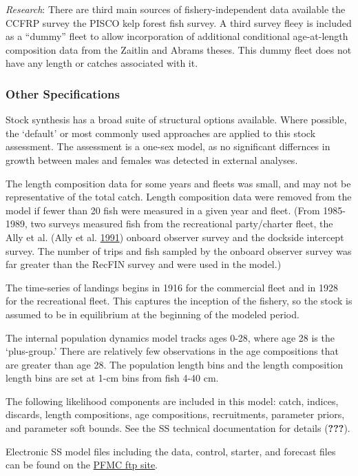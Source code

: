 \documentclass[12pt,]{article}
\begin{document}
\emph{Research}: There are third main sources of fishery-independent
data available the CCFRP survey the PISCO kelp forest fish survey. A
third survey fleey is included as a ``dummy'' fleet to allow
incorporation of additional conditional age-at-length composition data
from the Zaitlin and Abrams theses. This dummy fleet does not have any
length or catches associated with it.

\subsubsection{Other Specifications}\label{other-specifications}

Stock synthesis has a broad suite of structural options available. Where
possible, the `default' or most commonly used approaches are applied to
this stock assessment. The assessment is a one-sex model, as no
significant differnces in growth between males and females was detected
in external analyses.

The length composition data for some years and fleets was small, and may
not be representative of the total catch. Length composition data were
removed from the model if fewer than 20 fish were measured in a given
year and fleet. (From 1985-1989, two surveys measured fish from the
recreational party/charter fleet, the Ally et al. (Ally et al.
\protect\hyperlink{ref-Ally1991}{1991}) onboard observer survey and the
dockside intercept survey. The number of trips and fish sampled by the
onboard observer survey was far greater than the RecFIN survey and were
used in the model.)

The time-series of landings begins in 1916 for the commercial fleet and
in 1928 for the recreational fleet. This captures the inception of the
fishery, so the stock is assumed to be in equilibrium at the beginning
of the modeled period.

The internal population dynamics model tracks ages 0-28, where age 28 is
the `plus-group.' There are relatively few observations in the age
compositions that are greater than age 28. The population length bins
and the length composition length bins are set at 1-cm bins from fish
4-40 cm.

The following likelihood components are included in this model: catch,
indices, discards, length compositions, age compositions, recruitments,
parameter priors, and parameter soft bounds. See the SS technical
documentation for details ({\textbf{???}}).

Electronic SS model files including the data, control, starter, and
forecast files can be found on the
\href{ftp://ftp.pcouncil.org/pub/!2019\%20GF\%20STAR\%20Panels/STAR\%20Panel\%204\%20-\%20Cowcod-Gopher/}{PFMC
ftp site}.
\end{document}
